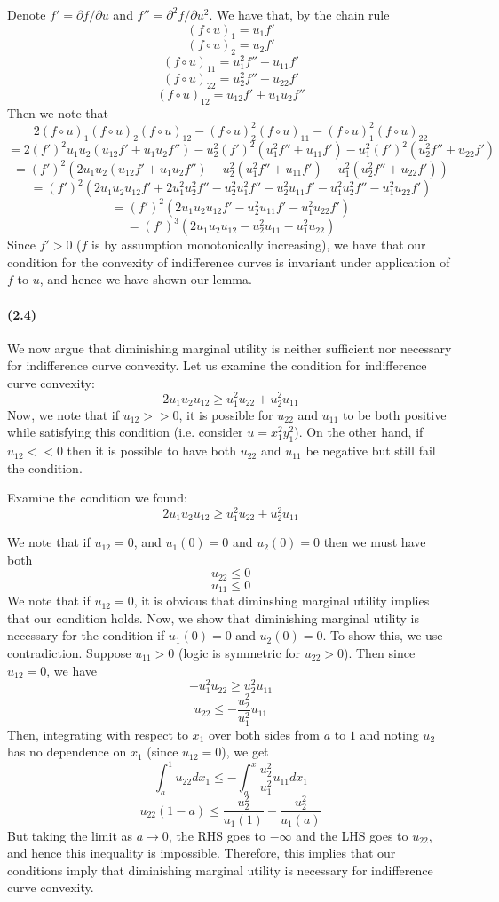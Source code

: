 \documentclass[10pt,letter]{article}
\begin{document}
Denote $f' = \partial f/\partial u$ and $f'' = \partial^2 f/\partial u^2$. We have that, by the chain rule
\[ (f \circ u)_1 = u_1 f' \]
\[ (f \circ u)_2 = u_2 f' \]
\[ (f \circ u)_{11} = u_1^2 f'' + u_{11} f'\]
\[ (f \circ u)_{22} = u_2^2 f'' + u_{22} f'\]
\[ (f \circ u)_{12} = u_{12} f' + u_1 u_2 f''\]
Then we note that
\[ 2(f \circ u)_1(f \circ u)_2(f \circ u)_{12} - (f \circ u)_2^2(f \circ u)_{11} - (f \circ u)_1^2(f \circ u)_{22} \]
\[ = 2(f')^2u_1u_2(u_{12} f' + u_1 u_2 f'') - u_2^2 (f')^2(u_1^2 f'' + u_{11} f') - u_1^2(f')^2(u_2^2 f'' + u_{22} f') \]
\[ = (f')^2 \left( 2u_1u_2(u_{12} f' + u_1 u_2 f'') - u_2^2(u_1^2 f'' + u_{11} f') - u_1^2(u_2^2 f'' + u_{22} f') \right) \]
\[ = (f')^2 \left( 2u_1u_2u_{12} f' + 2u_1^2 u_2^2 f'' - u_2^2u_1^2 f'' - u_2^2 u_{11} f' - u_1^2u_2^2 f'' - u_1^2 u_{22} f' \right) \]
\[ = (f')^2 \left( 2u_1u_2u_{12} f'  - u_2^2 u_{11} f' - u_1^2 u_{22} f' \right) \]
\[ = (f')^3 \left( 2u_1u_2u_{12}  - u_2^2 u_{11} - u_1^2 u_{22} \right) \]
Since $f' > 0$ ($f$ is by assumption monotonically increasing), we have that our condition for the convexity of indifference curves is invariant under application of $f$ to $u$, and hence we have shown our lemma.
\paragraph{(2.4)}
We now argue that diminishing marginal utility is neither sufficient nor necessary for indifference curve convexity. Let us examine the condition for indifference curve convexity:
\[ 2u_1 u_2 u_{12} \ge u_1^2 u_{22} + u_2^2 u_{11} \]
Now, we note that if $u_{12} >> 0$, it is possible for $u_{22}$ and $u_{11}$ to be both positive while satisfying this condition (i.e. consider $u = x_1^2y_1^2$). On the other hand, if $u_{12} << 0$ then it is possible to have both $u_{22}$ and $u_{11}$ be negative but still fail the condition.

Examine the condition we found:
\[ 2u_1u_2u_{12} \ge u_1^2 u_{22} + u_2^2 u_{11}\]

We note that if $u_{12} = 0$, and $u_1(0) = 0$ and $u_2(0) = 0$ then we must have both
\[ u_{22} \le 0\]
\[ u_{11} \le 0\]
We note that if $u_{12} = 0$, it is obvious that diminshing marginal utility implies that our condition holds. Now, we show that diminishing marginal utility is necessary for the condition if $u_1(0) = 0$ and $u_2(0) = 0$.
To show this, we use contradiction. Suppose $u_{11} > 0$ (logic is symmetric for $u_{22} > 0$). Then since $u_{12} = 0$, we have
\[ - u_1^2 u_{22} \ge u_2^2 u_{11} \]
\[ u_{22} \le - \frac{u_2^2}{u_1^2}u_{11} \]
Then, integrating with respect to $x_1$ over both sides from $a$ to $1$ and noting $u_2$ has no dependence on $x_1$ (since $u_{12} = 0$), we get
\[ \int_a^1 u_{22} dx_1 \le - \int_a^x \frac{u_2^2}{u_1^2}u_{11} dx_1 \]
\[ u_{22} (1-a) \le \frac{u_2^2}{u_1(1)} - \frac{u_2^2}{u_1(a)} \]
But taking the limit as $a \to 0$, the RHS goes to $-\infty$ and the LHS goes to $u_{22}$, and hence this inequality is impossible. Therefore, this implies that our conditions imply that diminishing marginal utility is necessary for indifference curve convexity.
\end{document}
